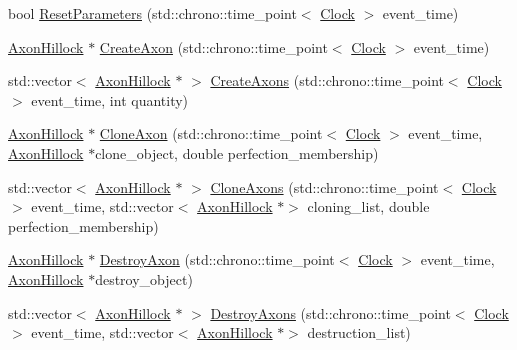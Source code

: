 \begin{DoxyCompactItemize}
\item 
bool \mbox{\hyperlink{class_axon_hillock_acec1571ef0b74f7f5ce6699c9b459b4f}{Reset\+Parameters}} (std\+::chrono\+::time\+\_\+point$<$ \mbox{\hyperlink{universe_8h_a0ef8d951d1ca5ab3cfaf7ab4c7a6fd80}{Clock}} $>$ event\+\_\+time)
\item 
\mbox{\hyperlink{class_axon_hillock}{Axon\+Hillock}} $\ast$ \mbox{\hyperlink{class_axon_hillock_ae6b18ec6f2921b9d4461b89a9d72ab25}{Create\+Axon}} (std\+::chrono\+::time\+\_\+point$<$ \mbox{\hyperlink{universe_8h_a0ef8d951d1ca5ab3cfaf7ab4c7a6fd80}{Clock}} $>$ event\+\_\+time)
\item 
std\+::vector$<$ \mbox{\hyperlink{class_axon_hillock}{Axon\+Hillock}} $\ast$ $>$ \mbox{\hyperlink{class_axon_hillock_a15bf1a433f38b8b0c92e4a4efe22ec6f}{Create\+Axons}} (std\+::chrono\+::time\+\_\+point$<$ \mbox{\hyperlink{universe_8h_a0ef8d951d1ca5ab3cfaf7ab4c7a6fd80}{Clock}} $>$ event\+\_\+time, int quantity)
\item 
\mbox{\hyperlink{class_axon_hillock}{Axon\+Hillock}} $\ast$ \mbox{\hyperlink{class_axon_hillock_ad54833cee03cfcacb5e88d174048aaa4}{Clone\+Axon}} (std\+::chrono\+::time\+\_\+point$<$ \mbox{\hyperlink{universe_8h_a0ef8d951d1ca5ab3cfaf7ab4c7a6fd80}{Clock}} $>$ event\+\_\+time, \mbox{\hyperlink{class_axon_hillock}{Axon\+Hillock}} $\ast$clone\+\_\+object, double perfection\+\_\+membership)
\item 
std\+::vector$<$ \mbox{\hyperlink{class_axon_hillock}{Axon\+Hillock}} $\ast$ $>$ \mbox{\hyperlink{class_axon_hillock_aa65cead56b10bda66dc256c68764a553}{Clone\+Axons}} (std\+::chrono\+::time\+\_\+point$<$ \mbox{\hyperlink{universe_8h_a0ef8d951d1ca5ab3cfaf7ab4c7a6fd80}{Clock}} $>$ event\+\_\+time, std\+::vector$<$ \mbox{\hyperlink{class_axon_hillock}{Axon\+Hillock}} $\ast$$>$ cloning\+\_\+list, double perfection\+\_\+membership)
\item 
\mbox{\hyperlink{class_axon_hillock}{Axon\+Hillock}} $\ast$ \mbox{\hyperlink{class_axon_hillock_a031b2cc7292d023506a5124639a941a7}{Destroy\+Axon}} (std\+::chrono\+::time\+\_\+point$<$ \mbox{\hyperlink{universe_8h_a0ef8d951d1ca5ab3cfaf7ab4c7a6fd80}{Clock}} $>$ event\+\_\+time, \mbox{\hyperlink{class_axon_hillock}{Axon\+Hillock}} $\ast$destroy\+\_\+object)
\item 
std\+::vector$<$ \mbox{\hyperlink{class_axon_hillock}{Axon\+Hillock}} $\ast$ $>$ \mbox{\hyperlink{class_axon_hillock_a083c918c64c60f3cea1d39aa8e0c6fba}{Destroy\+Axons}} (std\+::chrono\+::time\+\_\+point$<$ \mbox{\hyperlink{universe_8h_a0ef8d951d1ca5ab3cfaf7ab4c7a6fd80}{Clock}} $>$ event\+\_\+time, std\+::vector$<$ \mbox{\hyperlink{class_axon_hillock}{Axon\+Hillock}} $\ast$$>$ destruction\+\_\+list)

\end{DoxyCompactItemize}

